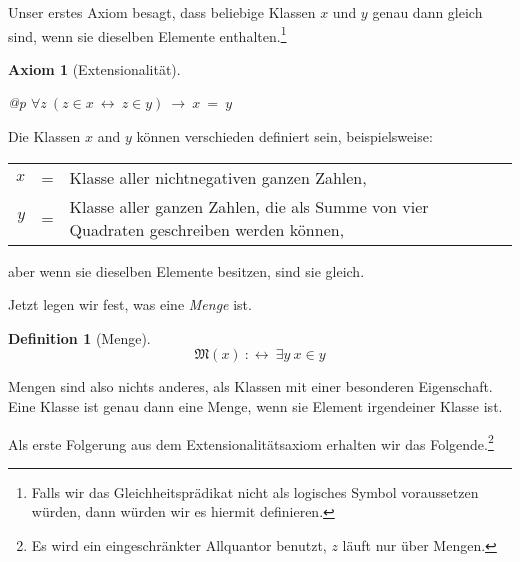 \documentclass[a4paper,german,10pt,twoside]{book}
\newtheorem{ax}{Axiom}
\theoremstyle{definition}
\newtheorem{defn}[thm]{Definition}
\theoremstyle{remark}
\begin{document}
\par
Unser erstes Axiom besagt, dass beliebige Klassen $x$ und $y$ genau dann gleich sind, wenn sie dieselben Elemente enthalten.\footnote{Falls wir das Gleichheitspr{\"a}dikat nicht als logisches Symbol voraussetzen w{\"u}rden, dann w{\"u}rden wir es hiermit definieren.}

\begin{ax}[Extensionalit{\"a}t]
\label{axiom:extensionality} \hypertarget{axiom:extensionality}{}
\mbox{}
\begin{longtable}{{@{\extracolsep{\fill}}p{\linewidth}}}
\centering $\forall z\ (z \in x\ \leftrightarrow \ z \in y)\ \rightarrow \ x \ =  \ y$
\end{longtable}

\end{ax}

Die Klassen $x$ and $y$ k{\"o}nnen verschieden definiert sein, beispielsweise:
\par
\begin{tabularx}{\linewidth}{rcX}
  $x$ & = & Klasse aller nichtnegativen ganzen Zahlen, \\
  $y$ & = & Klasse aller ganzen Zahlen, die als Summe von vier Quadraten geschreiben werden k{\"o}nnen,
\end{tabularx}
\par
aber wenn sie dieselben Elemente besitzen, sind sie gleich.


\par
Jetzt legen wir fest, was eine \emph{Menge} ist.

\begin{defn}[Menge]
\label{definition:isSet} \hypertarget{definition:isSet}{}
$$\mathfrak{M}(x)\ :\leftrightarrow \ \exists y\ x \in y$$

\end{defn}

Mengen sind also nichts anderes, als Klassen mit einer besonderen Eigenschaft. Eine Klasse ist genau dann eine Menge, wenn sie Element irgendeiner Klasse ist.


\par
Als erste Folgerung aus dem Extensionalit{\"a}tsaxiom erhalten wir das Folgende.\footnote{Es wird ein eingeschr{\"a}nkter Allquantor benutzt, $z$ l{\"a}uft nur {\"u}ber Mengen.}
\end{document}
